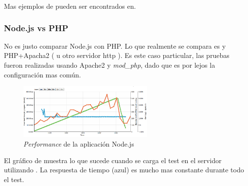 
Mas ejemplos de \benchmark pueden ser encontrados en\cite{online_nodejs_java_dzone}.


\subsubsection{Node.js vs PHP\cite{online_nodejs_php_loadimpact}}

No es justo comparar Node.js con PHP. Lo que realmente se compara es \nodejs y PHP+Apacha2 ( u otro servidor http ). Es este caso particular, las pruebas fueron realizadas usando Apache2 y \textit{mod\_php}, dado que es por lejos la configuración mas común. 

\begin{figure}[h!]
	\centering
	\includegraphics[width=0.6\textwidth]{figuras/cap2/node_benchmak_loadimpact.png}
	\caption{\textit{Performance} de la aplicación Node.js}
	\label{figure:node_benchmark_nodephp}
\end{figure}

El gráfico de  muestra lo que sucede cuando se carga el test en el servidor utilizando \nodejs. La respuesta de tiempo (azul) es mucho mas constante durante todo el test. 

